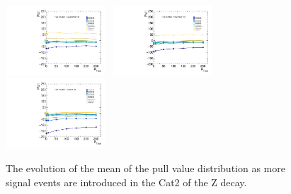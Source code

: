 \begin{figure}[!ht]
  \includegraphics[width=0.33\textwidth]{Fig/BiasStudy/Linearity/ZJpsiG_Cat2/pull_mean_linearity_TrueFunc6}~
  \includegraphics[width=0.33\textwidth]{Fig/BiasStudy/Linearity/ZJpsiG_Cat2/pull_mean_linearity_TrueFunc7}~
  \includegraphics[width=0.33\textwidth]{Fig/BiasStudy/Linearity/ZJpsiG_Cat2/pull_mean_linearity_TrueFunc8}\\
  \caption{The evolution of the mean of the pull value distribution as more signal events are introduced in the Cat2 of the Z decay.}
  \label{fig:Linearity_mean_ZJpsiG_Cat2}
\end{figure}
\clearpage
%
